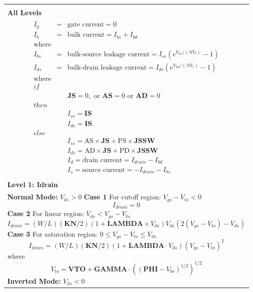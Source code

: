


\begin{longtable}[H]{>{\setlength{\hsize}{\textwidth}}W}
\hline \\
\bf All Levels \\
\begin{eqnarray*}
I_g&=&\mbox{gate current} = 0 \\
I_b&=&\mbox{bulk current} = I_{bs} + I_{bd} \\
\mbox{where} && \\
I_{bs}&=&\mbox{bulk-source leakage current} =
I_{ss}\left(e^{V_{bs}/(NV_t)} - 1\right) \\
I_{ds}&=&\mbox{bulk-drain leakage current} = I_{ds}\left(
e^{V_{bd}/(NV_t)} - 1\right)\\
\mbox{where} && \\
\mathit{if} && \\
&&\mathbf{JS}=0, \mbox{ or } \mathbf{AS}=0 \mbox{ or }
\mathbf{AD}=0 \\
\mathit{then} && \\
&&I_{ss} = \mathbf{IS} \\
&&I_{ds} = \mathbf{IS} \\
\mathit{else} && \\
&&I_{ss} = \mathrm{AS}\times\mathbf{JS} + \mathrm{PS}\times
\mathbf{JSSW} \\
&&I_{ds} = \mathrm{AD}\times\mathbf{JS} + \mathrm{PD}\times
\mathbf{JSSW} \\
&&I_d = \mbox{drain current} = I_{drain} - I_{bd} \\
&&I_s = \mbox{source current} = -I_{drain} - I_{bs}
\end{eqnarray*} \\

\hline \\
\bf Level 1: Idrain \\

\textbf{Normal Mode:} $V_{ds} > 0$ \linebreak
\textbf{Case 1} \linebreak
For cutoff region: $V_{gs} - V_{to} < 0$
\[ I_{drain} = 0\]
\textbf{Case 2} \linebreak
For linear region: $V_{ds} < V_{gs} - V_{to}$
\[ I_{drain} = (W/L)(\mathbf{KN}/2)(1 + \mathbf{LAMBDA}\times
V_{ds})V_{ds}(2(V_{gs} - V_{to}) - V_{ds}) \]
\textbf{Case 3} \linebreak
For saturation region: $0\leq V_{gs} - V_{to} \leq V_{ds}$
\[ I_{drain} = (W/L)(\mathbf{KN}/2)(1 + \mathbf{LAMBDA}\cdot
V_{ds})(V_{gs} - V_{to})^2 \]
where
\[ V_{to} = \mathbf{VTO + GAMMA}\cdot\left((\mathbf{PHI} -
V_{bs})^{1/2}\right)^{1/2} \]
\textbf{Inverted Mode:} $V_{ds} < 0$\\


\end{longtable}
